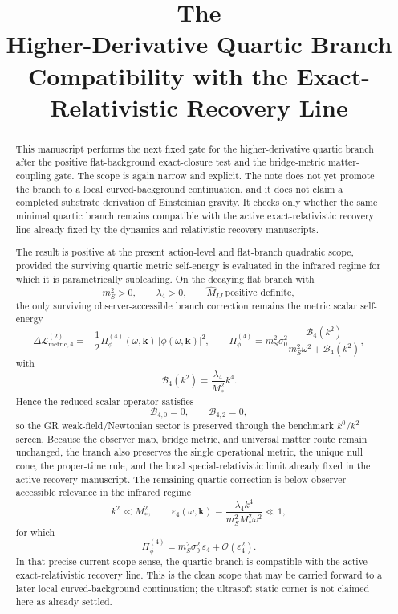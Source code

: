 \documentclass[11pt]{article}
\title{\textbf{The \TheoryName{}}\\[0.4em]
\large Higher-Derivative Quartic Branch Compatibility with the Exact-Relativistic Recovery Line}
\author{}
\date{}
\begin{document}
\maketitle

\begin{abstract}
This manuscript performs the next fixed gate for the higher-derivative quartic branch after the positive flat-background exact-closure test and the bridge-metric matter-coupling gate. The scope is again narrow and explicit. The note does not yet promote the branch to a local curved-background continuation, and it does not claim a completed substrate derivation of Einsteinian gravity. It checks only whether the same minimal quartic branch remains compatible with the active exact-relativistic recovery line already fixed by the dynamics and relativistic-recovery manuscripts.

The result is positive at the present action-level and flat-branch quadratic scope, provided the surviving quartic metric self-energy is evaluated in the infrared regime for which it is parametrically subleading. On the decaying flat branch with
\[
m_S^2>0,
\qquad
\lambda_4>0,
\qquad
\widehat M_{IJ}\ \text{positive definite},
\]
the only surviving observer-accessible branch correction remains the metric scalar self-energy
\[
\Delta\mathcal L_{\mathrm{metric},4}^{(2)}
=
-\frac{1}{2}\Pi_\phi^{(4)}(\omega,\mathbf{k})\,|\phi(\omega,\mathbf{k})|^2,
\qquad
\Pi_\phi^{(4)}
=
m_S^2\sigma_0^2
\frac{\mathcal B_4(k^2)}
{m_S^2\omega^2+\mathcal B_4(k^2)},
\]
with
\[
\mathcal B_4(k^2)=\frac{\lambda_4}{M_*^2}k^4.
\]
Hence the reduced scalar operator satisfies
\[
\mathcal B_{4,0}=0,
\qquad
\mathcal B_{4,2}=0,
\]
so the GR weak-field/Newtonian sector is preserved through the benchmark \(k^0/k^2\) screen. Because the observer map, bridge metric, and universal matter route remain unchanged, the branch also preserves the single operational metric, the unique null cone, the proper-time rule, and the local special-relativistic limit already fixed in the active recovery manuscript. The remaining quartic correction is below observer-accessible relevance in the infrared regime
\[
k^2\ll M_*^2,
\qquad
\varepsilon_4(\omega,\mathbf{k})
\equiv
\frac{\lambda_4 k^4}{m_S^2M_*^2\omega^2}
\ll 1,
\]
for which
\[
\Pi_\phi^{(4)}
=
m_S^2\sigma_0^2\,\varepsilon_4
+ \mathcal O(\varepsilon_4^2).
\]
In that precise current-scope sense, the quartic branch is compatible with the active exact-relativistic recovery line. This is the clean scope that may be carried forward to a later local curved-background continuation; the ultrasoft static corner is not claimed here as already settled.
\end{abstract}
\end{document}
